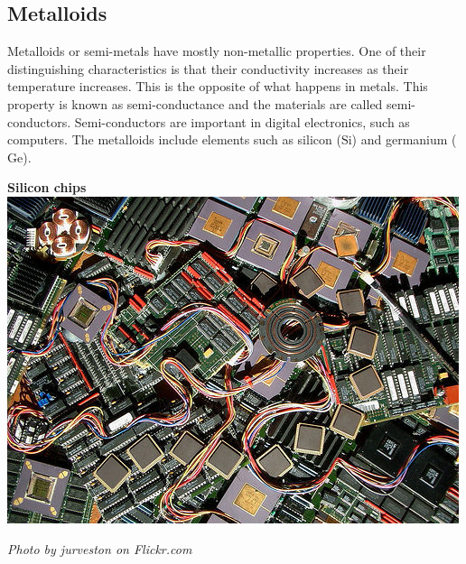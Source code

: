             \subsection*{Metalloids}
            \nopagebreak
\begin{minipage}{.5\textwidth}
        \label{m38708*id66042}Metalloids or semi-metals have mostly non-metallic properties. One of their distinguishing characteristics is that their conductivity increases as their temperature increases. This is the opposite of what happens in metals. This property is known as semi-conductance and the materials are called semi-conductors. Semi-conductors are important in digital electronics, such as computers. The metalloids include elements such as silicon ($\text{Si}$) and germanium ($\text{Ge}$).\par 
\end{minipage}
\begin{minipage}{.5\textwidth}
\begin{center}
\textbf{Silicon chips}\\
 \includegraphics[width=.6\textwidth]{photos/siliconby-jurveston.jpg}\par
\textit{Photo by jurveston on Flickr.com}
\end{center}
\end{minipage}
\par \label{m38708*eip-586} 
      \noindent
